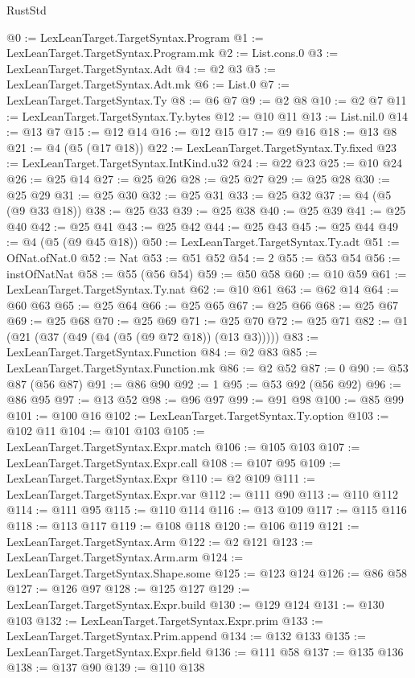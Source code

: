 \begin{lexlean}{RustStd}
\begin{coremodule}
@0 := LexLeanTarget.TargetSyntax.Program
@1 := LexLeanTarget.TargetSyntax.Program.mk
@2 := List.cons.{0}
@3 := LexLeanTarget.TargetSyntax.Adt
@4 := @2 @3
@5 := LexLeanTarget.TargetSyntax.Adt.mk
@6 := List.{0}
@7 := LexLeanTarget.TargetSyntax.Ty
@8 := @6 @7
@9 := @2 @8
@10 := @2 @7
@11 := LexLeanTarget.TargetSyntax.Ty.bytes
@12 := @10 @11
@13 := List.nil.{0}
@14 := @13 @7
@15 := @12 @14
@16 := @12 @15
@17 := @9 @16
@18 := @13 @8
@21 := @4 (@5 (@17 @18))
@22 := LexLeanTarget.TargetSyntax.Ty.fixed
@23 := LexLeanTarget.TargetSyntax.IntKind.u32
@24 := @22 @23
@25 := @10 @24
@26 := @25 @14
@27 := @25 @26
@28 := @25 @27
@29 := @25 @28
@30 := @25 @29
@31 := @25 @30
@32 := @25 @31
@33 := @25 @32
@37 := @4 (@5 (@9 @33 @18))
@38 := @25 @33
@39 := @25 @38
@40 := @25 @39
@41 := @25 @40
@42 := @25 @41
@43 := @25 @42
@44 := @25 @43
@45 := @25 @44
@49 := @4 (@5 (@9 @45 @18))
@50 := LexLeanTarget.TargetSyntax.Ty.adt
@51 := OfNat.ofNat.{0}
@52 := Nat
@53 := @51 @52
@54 := 2
@55 := @53 @54
@56 := instOfNatNat
@58 := @55 (@56 @54)
@59 := @50 @58
@60 := @10 @59
@61 := LexLeanTarget.TargetSyntax.Ty.nat
@62 := @10 @61
@63 := @62 @14
@64 := @60 @63
@65 := @25 @64
@66 := @25 @65
@67 := @25 @66
@68 := @25 @67
@69 := @25 @68
@70 := @25 @69
@71 := @25 @70
@72 := @25 @71
@82 := @1 (@21 (@37 (@49 (@4 (@5 (@9 @72 @18)) (@13 @3)))))
@83 := LexLeanTarget.TargetSyntax.Function
@84 := @2 @83
@85 := LexLeanTarget.TargetSyntax.Function.mk
@86 := @2 @52
@87 := 0
@90 := @53 @87 (@56 @87)
@91 := @86 @90
@92 := 1
@95 := @53 @92 (@56 @92)
@96 := @86 @95
@97 := @13 @52
@98 := @96 @97
@99 := @91 @98
@100 := @85 @99
@101 := @100 @16
@102 := LexLeanTarget.TargetSyntax.Ty.option
@103 := @102 @11
@104 := @101 @103
@105 := LexLeanTarget.TargetSyntax.Expr.match
@106 := @105 @103
@107 := LexLeanTarget.TargetSyntax.Expr.call
@108 := @107 @95
@109 := LexLeanTarget.TargetSyntax.Expr
@110 := @2 @109
@111 := LexLeanTarget.TargetSyntax.Expr.var
@112 := @111 @90
@113 := @110 @112
@114 := @111 @95
@115 := @110 @114
@116 := @13 @109
@117 := @115 @116
@118 := @113 @117
@119 := @108 @118
@120 := @106 @119
@121 := LexLeanTarget.TargetSyntax.Arm
@122 := @2 @121
@123 := LexLeanTarget.TargetSyntax.Arm.arm
@124 := LexLeanTarget.TargetSyntax.Shape.some
@125 := @123 @124
@126 := @86 @58
@127 := @126 @97
@128 := @125 @127
@129 := LexLeanTarget.TargetSyntax.Expr.build
@130 := @129 @124
@131 := @130 @103
@132 := LexLeanTarget.TargetSyntax.Expr.prim
@133 := LexLeanTarget.TargetSyntax.Prim.append
@134 := @132 @133
@135 := LexLeanTarget.TargetSyntax.Expr.field
@136 := @111 @58
@137 := @135 @136
@138 := @137 @90
@139 := @110 @138

\end{coremodule}
\end{lexlean}
